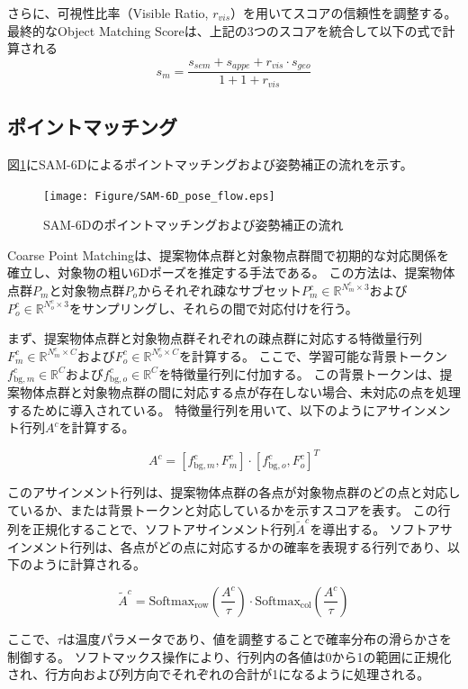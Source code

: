さらに、可視性比率（Visible Ratio, $r_{vis}$）を用いてスコアの信頼性を調整する。
最終的なObject Matching Scoreは、上記の3つのスコアを統合して以下の式で計算される
\[
s_m = \frac{s_{sem} + s_{appe} + r_{vis} \cdot s_{geo}}{1 + 1 + r_{vis}}
\]



\subsection{ポイントマッチング}
図\ref{fig:f6}にSAM-6Dによるポイントマッチングおよび姿勢補正の流れを示す。
\begin{figure}[htbt]
	\centering
	 \texttt{[image: Figure/SAM-6D\_pose\_flow.eps]}
	 \caption{SAM-6Dのポイントマッチングおよび姿勢補正の流れ}
	 \label{fig:f6}
\end{figure}

Coarse Point Matchingは、提案物体点群と対象物点群間で初期的な対応関係を確立し、対象物の粗い6Dポーズを推定する手法である。
この方法は、提案物体点群$P_m$と対象物点群$P_o$からそれぞれ疎なサブセット$P_m^c \in \mathbb{R}^{N_m^c \times 3}$および$P_o^c \in \mathbb{R}^{N_o^c \times 3}$をサンプリングし、それらの間で対応付けを行う。

まず、提案物体点群と対象物点群それぞれの疎点群に対応する特徴量行列$F_m^c \in \mathbb{R}^{N_m^c \times C}$および$F_o^c \in \mathbb{R}^{N_o^c \times C}$を計算する。
ここで、学習可能な背景トークン$f_{\text{bg}, m}^c \in \mathbb{R}^C$および$f_{\text{bg}, o}^c \in \mathbb{R}^C$を特徴量行列に付加する。
この背景トークンは、提案物体点群と対象物点群の間に対応する点が存在しない場合、未対応の点を処理するために導入されている。
特徴量行列を用いて、以下のようにアサインメント行列$A^c$を計算する。

\[
A^c = [f_{\text{bg}, m}^c, F_m^c] \cdot [f_{\text{bg}, o}^c, F_o^c]^T
\]

このアサインメント行列は、提案物体点群の各点が対象物点群のどの点と対応しているか、または背景トークンと対応しているかを示すスコアを表す。
この行列を正規化することで、ソフトアサインメント行列$\tilde{A}^c$を導出する。
ソフトアサインメント行列は、各点がどの点に対応するかの確率を表現する行列であり、以下のように計算される。

\[
\tilde{A}^c = \text{Softmax}_{\text{row}}\left(\frac{A^c}{\tau}\right) \cdot \text{Softmax}_{\text{col}}\left(\frac{A^c}{\tau}\right)
\]

ここで、$\tau$は温度パラメータであり、値を調整することで確率分布の滑らかさを制御する。
ソフトマックス操作により、行列内の各値は0から1の範囲に正規化され、行方向および列方向でそれぞれの合計が1になるように処理される。

